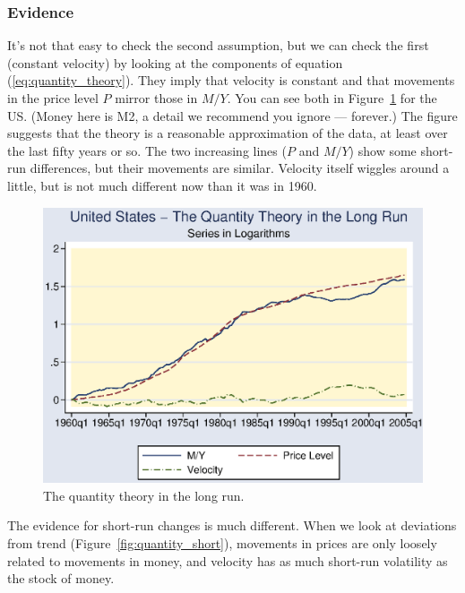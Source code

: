 \documentclass[letterpaper,12pt]{article}
\begin{document}
\subsubsection*{Evidence}

It's not that easy to check the second assumption, but we can
check the first (constant velocity) by looking at the components of
equation (\ref{eq:quantity_theory}).
They imply that velocity is constant and that movements in the price
level $P$ mirror those in $M/Y$.
You can see both in Figure~\ref{fig:quantity_long} for the US.
(Money here is M2, a detail we recommend you ignore --- forever.)
The figure suggests that the theory is a reasonable approximation of the data, at least
over the last fifty years or so.
The two increasing lines ($P$ and
$M/Y$) show some short-run differences, but their movements are similar.
Velocity itself wiggles around a little, but is not
much different now than it was in 1960.
%
\begin{figure}[h]
    \centering
    \includegraphics[scale=0.8]{long.eps}
    \caption{The quantity theory in the long run.}
    \label{fig:quantity_long}
\end{figure}
%

The evidence for short-run changes is much different.
When we look at deviations from trend (Figure~\ref{fig:quantity_short}), movements in prices are only loosely related to movements in money, and
velocity has as much short-run volatility as the stock of money.
\end{document}
